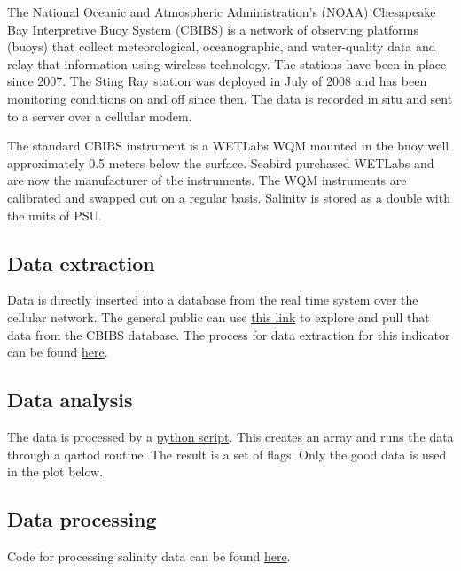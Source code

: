 \documentclass[
]{book}
\begin{document}
The National Oceanic and Atmospheric Administration's (NOAA) Chesapeake Bay Interpretive Buoy System (CBIBS) is a network of observing platforms (buoys) that collect meteorological, oceanographic, and water-quality data and relay that information using wireless technology. The stations have been in place since 2007. The Sting Ray station was deployed in July of 2008 and has been monitoring conditions on and off since then. The data is recorded in situ and sent to a server over a cellular modem.

The standard CBIBS instrument is a WETLabs WQM mounted in the buoy well approximately 0.5 meters below the surface. Seabird purchased WETLabs and are now the manufacturer of the instruments. The WQM instruments are calibrated and swapped out on a regular basis. Salinity is stored as a double with the units of PSU.

\hypertarget{data-extraction-6}{%
\subsection{Data extraction}\label{data-extraction-6}}

Data is directly inserted into a database from the real time system over the cellular network. The general public can use \href{https://buoybay.noaa.gov/observations/data-download}{this link} to explore and pull that data from the CBIBS database. The process for data extraction for this indicator can be found \href{https://github.com/NOAA-EDAB/tech-doc/tree/master/R/stored_scripts/ches_bay_sal_extraction.txt}{here}.

\hypertarget{data-analysis-5}{%
\subsection{Data analysis}\label{data-analysis-5}}

The data is processed by a \href{https://github.com/NOAA-EDAB/tech-doc/tree/master/R/stored_scripts/ches_bay_sal_analysis.py}{python script}. This creates an array and runs the data through a qartod routine. The result is a set of flags. Only the good data is used in the plot below.

\hypertarget{data-processing-4}{%
\subsection{Data processing}\label{data-processing-4}}

Code for processing salinity data can be found \href{https://github.com/NOAA-EDAB/ecodata/blob/master/data-raw/get_ch_bay_sal.R}{here}.
\end{document}

